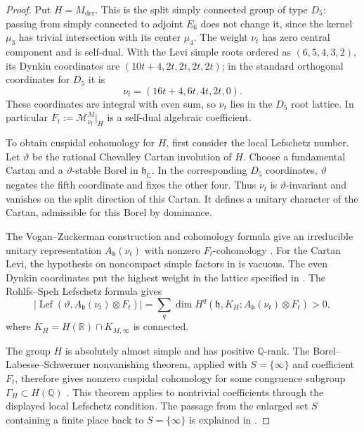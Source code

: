 \documentclass[12pt]{amsart}
\numberwithin{equation}{section}
\theoremstyle{plain}
\theoremstyle{definition}
\theoremstyle{remark}
\newcommand{\cM}{\mathcal M}
\begin{document}
\begin{proof}
Put $H=M_{\mathrm{der}}$. This is the split simply connected group of type $D_5$: passing from simply connected to adjoint $E_6$ does not change it, since the kernel $\mu_3$ has trivial intersection with its center $\mu_4$. The weight $\nu_t$ has zero central component and is self-dual. With the Levi simple roots ordered as $(6,5,4,3,2)$, its Dynkin coordinates are $(10t+4,2t,2t,2t,2t)$; in the standard orthogonal coordinates for $D_5$ it is
\[
 \nu_t=(16t+4,6t,4t,2t,0).
\]
These coordinates are integral with even sum, so $\nu_t$ lies in the $D_5$ root lattice. In particular $F_t:=\cM_{\nu_t}^M|_H$ is a self-dual algebraic coefficient.

To obtain cuspidal cohomology for $H$, first consider the local Lefschetz number. Let $\vartheta$ be the rational Chevalley Cartan involution of $H$. Choose a fundamental Cartan and a $\vartheta$-stable Borel in $\mathfrak h_{\mathbb C}$. In the corresponding $D_5$ coordinates, $\vartheta$ negates the
fifth coordinate and fixes the other four. Thus $\nu_t$ is $\vartheta$-invariant and vanishes on the split direction of this Cartan. It defines a unitary character of the Cartan, admissible for this Borel by dominance.

The Vogan--Zuckerman construction and cohomology formula give an irreducible unitary representation $A_{\mathfrak b}(\nu_t)$ with nonzero $F_t$-cohomology \cite[Thms.~5.3 and~5.5]{VoganZuckerman1984}. For the Cartan Levi, the hypothesis on noncompact simple factors in \cite[Prop.~6.5]{VoganZuckerman1984} is vacuous. The even Dynkin coordinates put the highest weight in the lattice specified in \cite[Def.~3.1.1]{RohlfsSpeh1989}. The Rohlfs--Speh Lefschetz formula \cite[Prop.~4.3]{RohlfsSpeh1989} gives
\[
 \bigl|\operatorname{Lef}
       (\vartheta,A_{\mathfrak b}(\nu_t)\otimes F_t)\bigr|
 =\sum_q\dim H^q(\mathfrak h,K_H;
                  A_{\mathfrak b}(\nu_t)\otimes F_t)>0,
\]
where $K_H=H(\mathbb R)\cap K_{M,\infty}$ is connected.

The group $H$ is absolutely almost simple and has positive $\mathbb Q$-rank. The Borel--Labesse--Schwermer nonvanishing theorem, applied with $S=\{\infty\}$ and coefficient $F_t$, therefore gives nonzero cuspidal cohomology for some congruence subgroup $\Gamma_H\subset H(\mathbb Q)$ \cite[Thm.~10.4]{BorelLabesseSchwermer1996}. This theorem applies to nontrivial coefficients through the displayed local Lefschetz condition. The passage from the enlarged set $S$ containing a finite place back to $S=\{\infty\}$ is explained in \cite[Thm.~6.5 and proof of Thm.~10.4]{BorelLabesseSchwermer1996}.


\end{proof}
\end{document}
